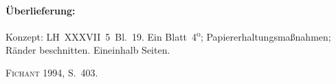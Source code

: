 %  
%
%
\frenchspacing
%
\begin{ledgroupsized}[r]{120mm}
\footnotesize
\pstart
\noindent\textbf{Überlieferung:}
\pend
\end{ledgroupsized}
%
\begin{ledgroupsized}[r]{114mm}
\footnotesize
\pstart \parindent -6mm
%
Konzept:
LH~XXXVII~5~Bl.~19. 
Ein Blatt~4\textsuperscript{o}; 
Papiererhaltungsmaßnahmen;
Ränder beschnitten.
Eineinhalb Seiten.
\pend
\end{ledgroupsized}
%
\begin{ledgroupsized}[r]{114mm}
\footnotesize
\pstart
\parindent -6mm
%
\cite{01056}\textsc{Fichant} 1994, S.~403.
\pend%
\end{ledgroupsized}
%
%
%
\vspace{5mm}

